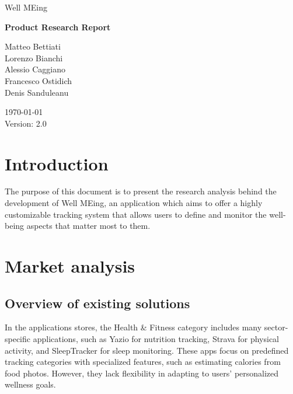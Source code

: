 \documentclass{article}
\begin{document}


\begin{center}

	\fontsize{20pt}{30pt}\selectfont
	Well MEing

	\vspace{2cm}

	\fontsize{25pt}{45pt}\selectfont
	\textbf{Product Research Report}

	\vfill

	\fontsize{12pt}{18pt}\selectfont
	Matteo Bettiati \\
	Lorenzo Bianchi \\
	Alessio Caggiano \\
	Francesco Ostidich \\
	Denis Sanduleanu \\

	\vspace{1cm}

	\today \\
	\vspace{12pt}
	Version: 2.0
	\normalsize

\end{center}

\newpage
{}
\tableofcontents
\newpage



\section{Introduction}

The purpose of this document is to present the research analysis behind the development of Well MEing, an application which aims to offer a highly customizable tracking system that allows users to define and monitor the well-being aspects that matter most to them.

\section{Market analysis}

\subsection{Overview of existing solutions}

In the applications stores, the Health \& Fitness category includes many sector-specific applications, such as Yazio for nutrition tracking, Strava for physical activity, and SleepTracker for sleep monitoring.
These apps focus on predefined tracking categories with specialized features, such as estimating calories from food photos.
However, they lack flexibility in adapting to users’ personalized wellness goals.
\end{document}
